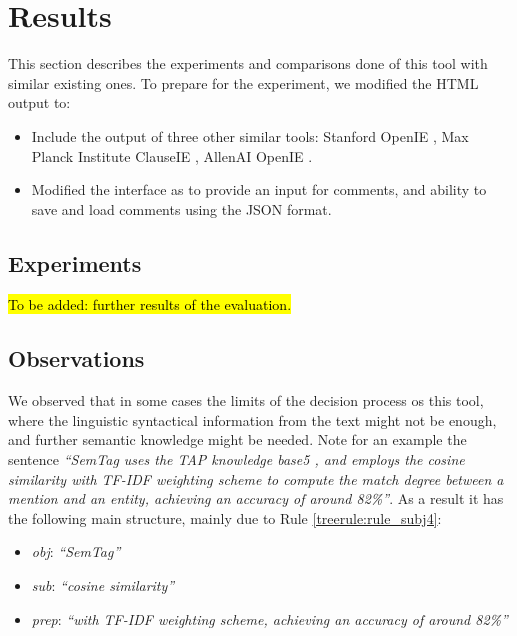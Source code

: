 \documentclass[11pt,a4paper,openright]{memoir}
\begin{document}
%
%
%
%

\chapter{Results}
\label{chapter:results}

This section describes the experiments and comparisons done of this tool with similar existing ones. To prepare for the experiment, we modified the HTML output to:
	\begin{itemize}
	  \item Include the output of three other similar tools: Stanford OpenIE \cite{angeli-johnsonpremkumar-manning:2015:ACL-IJCNLP}, Max Planck Institute ClauseIE \cite{DelCorro:2013:CCO:2488388.2488420}, AllenAI OpenIE \cite{Etzioni:2011:OIE:2283396.2283398}.
	  \item Modified the interface as to provide an input for comments, and ability to save and load comments using the JSON format.
	\end{itemize}


\section{Experiments}

\hl{To be added: further results of the evaluation.}

\section{Observations}

We observed that in some cases the limits of the decision process os this tool, where the linguistic syntactical information from the text might not be enough, and further semantic knowledge might be needed. Note for an example the sentence \emph{\enquote{SemTag uses the TAP knowledge base5 , and employs the cosine similarity with TF-IDF weighting scheme to compute the match degree between a mention and an entity, achieving an accuracy of around 82\%}}. As a result it has the following main structure, mainly due to Rule \ref{treerule:rule_subj4}:
	\begin{itemize}
	  \item \emph{obj}: \emph{\enquote{SemTag}}
	  \item \emph{sub}: \emph{\enquote{cosine similarity}}
	  \item \emph{prep}: \emph{\enquote{with TF-IDF weighting scheme, achieving an accuracy of around 82\%}}
	\end{itemize}
\end{document}

